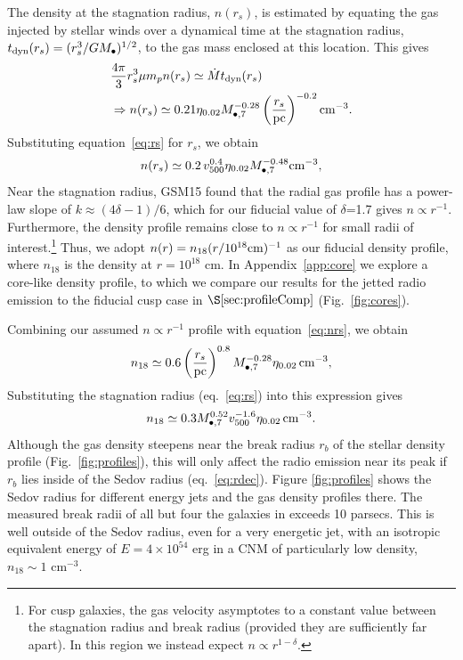 \documentclass[usenatbib,fleqn]{mnras}
\newcommand{\Mbh}[1][]{M_{\bullet#1}}
\newcommand{\rs}{r_s}
\begin{document}
The density at the stagnation radius, $n(\rs)$, is estimated by
equating the gas injected by stellar winds over a dynamical time at
the stagnation radius, $t_{\rm dyn} (\rs)=(\rs^3/G \Mbh)^{1/2}$, to
the gas mass enclosed at this location.  This gives
\begin{align}
  &\frac{4 \pi}{3} \rs^3 \mu m_p n(r_s) \simeq \dot{M} t_{\rm dyn}
  (\rs) \nonumber\\
  &\Rightarrow n(r_s) \simeq 0.21 \eta_{0.02} \Mbh[,7]^{-0.28} \left(\frac{r_s}{\rm
      pc}\right)^{-0.2} {\rm cm}^{-3}.
\label{eq:nrs}
\end{align}
%
Substituting equation~\eqref{eq:rs} for $r_s$, we obtain 
\begin{equation}
n(r_s) \simeq 0.2 \, v_{500}^{0.4} \eta_{0.02} \Mbh[,7]^{-0.48} {\rm cm}^{-3},
\label{eq:nrs2}
\end{equation}
%
Near the stagnation radius, GSM15 found that the radial gas profile
has a power-law slope of $k \approx (4\delta-1)/6$, which for our
fiducial value of $\delta$=1.7 gives $n \propto r^{-1}$. Furthermore,
the density profile remains close to $n\propto r^{-1}$ for small radii
of interest.\footnote{For cusp galaxies, the gas velocity asymptotes
  to a constant value between the stagnation radius and break radius
  (provided they are sufficiently far apart). In this region we
  instead expect $n\propto r^{1-\delta}$.}  Thus, we adopt $n(r)=
n_{18} (r/10^{18} {\rm cm})^{-1}$ as our fiducial density profile,
where $n_{18}$ is the density at $r = 10^{18}$ cm.  In
Appendix~\ref{app:core} we explore a core-like density profile, to
which we compare our results for the jetted radio emission to the
fiducial cusp case in $\S\ref{sec:profileComp}$ (Fig.~\ref{fig:cores}).

Combining our assumed $n\propto r^{-1}$ profile with
equation~\eqref{eq:nrs}, we obtain
\begin{equation}
  n_{18}\simeq 0.6 \left(\frac{r_s}{\rm pc}\right)^{0.8}
  \Mbh[,7]^{-0.28} \eta_{0.02} \, {\rm cm^{-3}},
  \label{eq:n18}
\end{equation}
%
Substituting the stagnation radius (eq.~\ref{eq:rs}) into this
expression gives
\begin{equation}
  n_{18}\simeq 0.3 \Mbh[,7]^{0.52} v_{500}^{-1.6} \eta_{0.02} \, {\rm
    cm^{-3}}.
\label{eq:n182}
\end{equation} 
%
Although the gas density steepens near the break radius $r_b$ of the
stellar density profile (Fig.~\ref{fig:profiles}), this will only
affect the radio emission near its peak if $r_b$ lies inside of the
Sedov radius (eq.~\ref{eq:rdec}).  Figure \ref{fig:profiles} shows the
Sedov radius for different energy jets and the gas density profiles
there.  The measured break radii of all but four the galaxies in
\citet{Lauer+2007} exceeds 10 parsecs.  This is well outside of the
Sedov radius, even for a very energetic jet, with an isotropic
equivalent energy of $E=4\times 10^{54}$ erg in a CNM of particularly
low density, $n_{18} \sim 1$ cm$^{-3}$.
\end{document}
